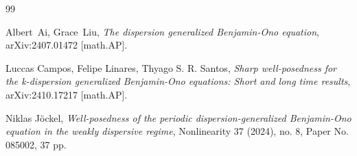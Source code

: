\documentclass[%
11pt,  reqno]{amsart}
\newcommand{\5}{\textup{V}}
\theoremstyle{remark}
\numberwithin{equation}{section}
\numberwithin{theorem}{section}
\begin{document}
\begin{thebibliography}{99}

Albert~Ai, Grace~Liu,
\textit{The dispersion generalized Benjamin-Ono equation}, 
arXiv:2407.01472 [math.AP]. 

Luccas Campos, Felipe Linares, Thyago S. R. Santos,
\textit{Sharp well-posedness for the k-dispersion generalized Benjamin-Ono equations: Short and long time results}, 
arXiv:2410.17217 [math.AP]. 

Niklas Jöckel, 
\textit{Well-posedness of the periodic dispersion-generalized Benjamin-Ono equation in the weakly dispersive regime}, 
Nonlinearity 37 (2024), no. 8, Paper No. 085002, 37 pp.

%
%
%
%
%
%
%
%
%
%
%
%
%
%
%

\end{thebibliography}
\end{document}
